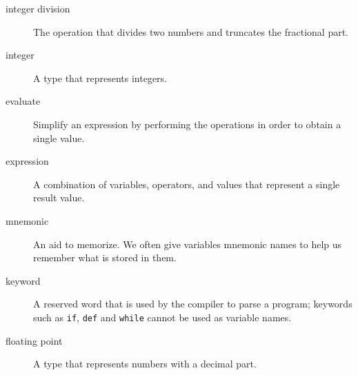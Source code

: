 
\begin{description}
\item[integer division]
The operation that divides two numbers and truncates the fractional part.
\end{description}


\begin{description}
\item[integer]
A type that represents integers.
\end{description}


\begin{description}
\item[evaluate]
Simplify an expression by performing the operations in order to obtain a single value.
\end{description}


\begin{description}
\item[expression]
A combination of variables, operators, and values that represent a single result value.
\end{description}


\begin{description}
\item[mnemonic]
An aid to memorize. We often give variables mnemonic names to help us remember what is stored in them.
\end{description}


\begin{description}
\item[keyword]
A reserved word that is used by the compiler to parse a program; keywords such as \texttt{if}, \texttt{def} and \texttt{while} cannot be used as variable names.
\end{description}


\begin{description}
\item[floating point]
A type that represents numbers with a decimal part.
\end{description}


